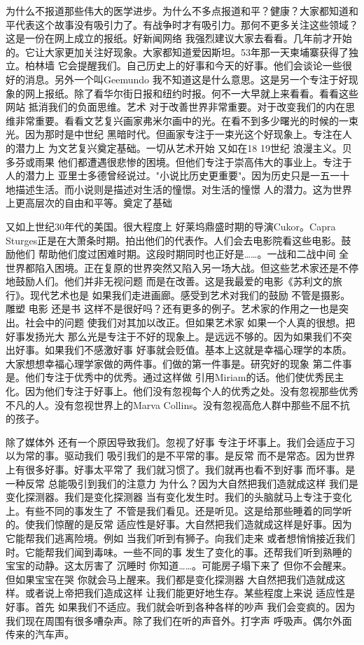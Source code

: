 为什么不报道那些伟大的医学进步。为什么不多点报道和平？健康？大家都知道和平代表这个故事没有吸引力了。有战争时才有吸引力。那何不更多关注这些领域？这是一份在网上成立的报纸。好新闻网络 我强烈建议大家去看看。几年前才开始的。它让大家更加关注好现象。大家都知道爱因斯坦。53年那一天柬埔寨获得了独立。柏林墙 它会提醒我们。自己历史上的好事和今天的好事。他们会谈论一些很好的消息。另外一个叫Geemundo 我不知道这是什么意思。这是另一个专注于好现象的网上报纸。除了看华尔街日报和纽约时报。何不一大早就上来看看。看看这些网站 抵消我们的负面思维。艺术 对于改善世界非常重要。对于改变我们的内在思维非常重要。看看文艺复兴画家弗米尔画中的光。在看不到多少曙光的时候的一束光。因为那时是中世纪 黑暗时代。但画家专注于一束光这个好现象上。专注在人的潜力上 为文艺复兴奠定基础。一切从艺术开始 又如在18 19世纪 浪漫主义。贝多芬或雨果 他们都遭遇很悲惨的困境。但他们专注于崇高伟大的事业上。专注于人的潜力上 亚里士多德曾经说过。"小说比历史更重要"。因为历史只是一五一十地描述生活。而小说则是描述对生活的憧憬。对生活的憧憬 人的潜力。这为世界上更高层次的自由和平等。奠定了基础 

又如上世纪30年代的美国。很大程度上 好莱坞鼎盛时期的导演Cukor。Capra Sturges正是在大萧条时期。拍出他们的代表作。人们会去电影院看这些电影。鼓励他们 帮助他们度过困难时期。这段时期同时也正好是……。一战和二战中间 全世界都陷入困境。正在复原的世界突然又陷入另一场大战。但这些艺术家还是不停地鼓励人们。他们并非无视问题 而是在改善。这是我最爱的电影《苏利文的旅行》。现代艺术也是 如果我们走进画廊。感受到艺术对我们的鼓励 不管是摄影。雕塑 电影 还是书 这样不是很好吗？还有更多的例子。艺术家的作用之一也是突出。社会中的问题 使我们对其加以改正。但如果艺术家 如果一个人真的很想。把好事发扬光大 那么光是专注于不好的现象上。是远远不够的。因为如果我们不突出好事。如果我们不感激好事 好事就会贬值。基本上这就是幸福心理学的本质。大家想想幸福心理学家做的两件事。们做的第一件事是。研究好的现象 第二件事是。他们专注于优秀中的优秀。通过这样做 引用Miriam的话。他们使优秀民主化。因为他们专注于好事上。他们没有忽视每个人的优秀之处。没有忽视那些优秀不凡的人。没有忽视世界上的Marva Collins。没有忽视高危人群中那些不屈不抗的孩子。 

除了媒体外 还有一个原因导致我们。忽视了好事 专注于坏事上。我们会适应于习以为常的事。驱动我们 吸引我们的是不平常的事。是反常 而不是常态。因为世界上有很多好事。好事太平常了 我们就习惯了。我们就再也看不到好事 而坏事。是一种反常 总能吸引到我们的注意力 为什么？因为大自然把我们造就成这样 我们是变化探测器。我们是变化探测器 当有变化发生时。我们的头脑就马上专注于变化上。有些不同的事发生了 不管是我们看见。还是听见。这是给那些睡着的同学听的。使我们惊醒的是反常 适应性是好事。大自然把我们造就成这样是好事。因为它能帮我们逃离险境。例如 当我们听到有狮子。向我们走来 或者想悄悄接近我们时。它能帮我们闻到毒味。一些不同的事 发生了变化的事。还帮我们听到熟睡的宝宝的动静。这太厉害了 沉睡时 你知道……。可能房子塌下来了 但你不会醒来。但如果宝宝在哭 你就会马上醒来。我们都是变化探测器 大自然把我们造就成这样。或者说上帝把我们造成这样 让我们能更好地生存。某些程度上来说 适应性是好事。首先 如果我们不适应。我们就会听到各种各样的吵声 我们会变疯的。因为我们现在周围有很多嘈杂声。除了我们在听的声音外。打字声 呼吸声。偶尔外面传来的汽车声。 

